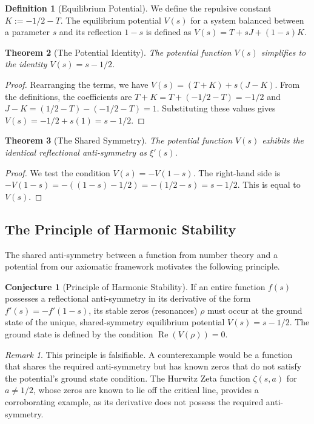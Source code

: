 \documentclass{amsart}
\theoremstyle{plain}
\newtheorem{theorem}{Theorem}[section]
\theoremstyle{definition}
\newtheorem{definition}[theorem]{Definition}
\newtheorem{conjecture}{Conjecture}
\theoremstyle{remark}
\newtheorem*{remark}{Remark}
\DeclareMathOperator{\re}{Re}
\begin{document}
\begin{definition}[Equilibrium Potential]
We define the repulsive constant $K := -1/2 - T$. The equilibrium potential $V(s)$ for a system balanced between a parameter $s$ and its reflection $1-s$ is defined as $V(s) = T + sJ + (1-s)K$. 
\end{definition}

\begin{theorem}[The Potential Identity]
\label{thm:potential_id}
The potential function $V(s)$ simplifies to the identity $V(s) = s - 1/2$. 
\end{theorem}
\begin{proof}
Rearranging the terms, we have $V(s) = (T+K) + s(J-K)$. From the definitions, the coefficients are $T+K = T + (-1/2 - T) = -1/2$ and $J-K = (1/2 - T) - (-1/2-T) = 1$. Substituting these values gives $V(s) = -1/2 + s(1) = s - 1/2$. 
\end{proof}

\begin{theorem}[The Shared Symmetry]
The potential function $V(s)$ exhibits the identical reflectional anti-symmetry as $\xi'(s)$.
\end{theorem}
\begin{proof}
We test the condition $V(s) = -V(1-s)$. The right-hand side is $-V(1-s) = -((1-s) - 1/2) = -(1/2 - s) = s - 1/2$. This is equal to $V(s)$. 
\end{proof}

\subsection{The Principle of Harmonic Stability}
The shared anti-symmetry between a function from number theory and a potential from our axiomatic framework motivates the following principle.
\begin{conjecture}[Principle of Harmonic Stability]
\label{conj:stability}
If an entire function $f(s)$ possesses a reflectional anti-symmetry in its derivative of the form $f'(s)=-f'(1-s)$, its stable zeros (resonances) $\rho$ must occur at the ground state of the unique, shared-symmetry equilibrium potential $V(s)=s-1/2$. The ground state is defined by the condition $\re(V(\rho))=0$. 
\end{conjecture}
\begin{remark}
This principle is falsifiable. A counterexample would be a function that shares the required anti-symmetry but has known zeros that do not satisfy the potential's ground state condition. The Hurwitz Zeta function $\zeta(s, a)$ for $a \neq 1/2$, whose zeros are known to lie off the critical line, provides a corroborating example, as its derivative does not possess the required anti-symmetry. 
\end{remark}
\end{document}
